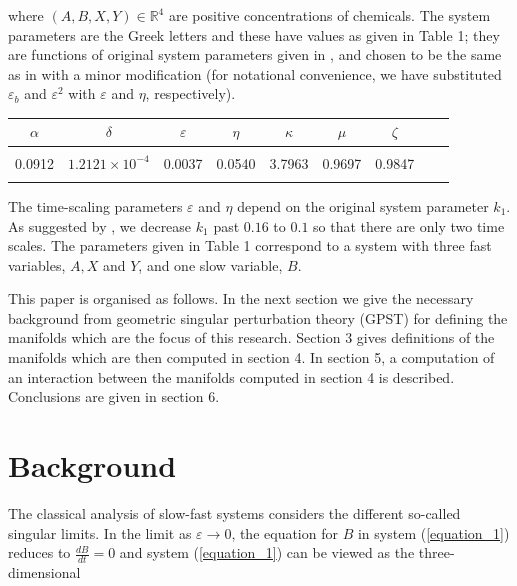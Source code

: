 \documentclass{ws-ijbc}
\begin{document}
\noindent
where $(A, B, X, Y)\in\mathbb{R}^{4}$ are positive concentrations of chemicals.  The system parameters are the Greek letters and these have values as given in Table 1; they are functions of original system parameters given in \cite{Olsen}, and chosen to be the same as in \cite{Rescaling} with a minor modification (for notational convenience, we have substituted  $\varepsilon_{b}$ and $\varepsilon^{2}$ with $\varepsilon$ and $\eta$, respectively).

\begin{table}[t!]
{\begin{tabular}{c  c  c  c  c  c  c  c  c} \\[-2pt]
\toprule
$\alpha$ & $\delta$ & $\varepsilon$ & $\eta$ & $\kappa$ & $\mu$ & $\zeta$ \\[6pt]
\hline\\[-2pt]
0.0912 & $1.2121 \times 10^{-4}$ & 0.0037 & 0.0540 & 3.7963 & 0.9697 & 0.9847\\[1pt]
\botrule
\end{tabular}}
\end{table}

The time-scaling parameters $\varepsilon$ and $\eta$ depend on the original system parameter $k_1$.  As suggested by \cite{Rescaling}, we decrease $k_{1}$ past $0.16$ to $0.1$ so that there are only two time scales.  The parameters given in Table 1 correspond to a system with three fast variables, $A, X$ and $Y$, and one slow variable, $B$.

This paper is organised as follows.  In the next section we give the necessary background from geometric singular perturbation theory (GPST) for defining the manifolds which are the focus of this research.  Section 3 gives definitions of the manifolds which are then computed in section 4.  In section 5, a computation of an interaction between the manifolds computed in section 4 is described.  Conclusions are given in section 6.

\section{Background}
    
The classical analysis of slow-fast systems considers the different so-called singular limits.  In the limit as $\varepsilon \rightarrow 0$, the equation for $B$ in system (\ref{equation_1}) reduces to $\frac{dB}{dt} = 0$ and system (\ref{equation_1}) can be viewed as the three-dimensional
    
\end{document}
